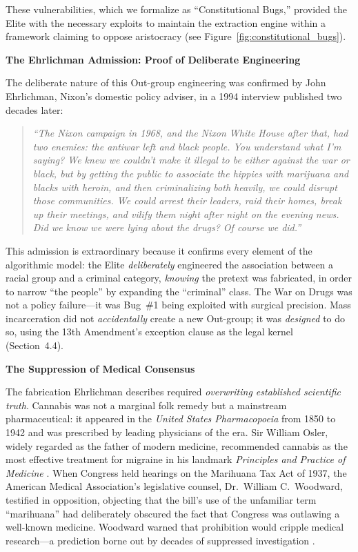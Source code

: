 \documentclass[12pt,openany]{book}
\begin{document}
These vulnerabilities, which we formalize as ``Constitutional Bugs,'' provided the Elite with the necessary exploits to maintain the extraction engine within a framework claiming to oppose aristocracy (see Figure~\ref{fig:constitutional_bugs}).

\textbf{The Ehrlichman Admission: Proof of Deliberate Engineering}

The deliberate nature of this Out-group engineering was confirmed by John Ehrlichman, Nixon's domestic policy adviser, in a 1994 interview published two decades later:

\begin{quote}
\textit{``The Nixon campaign in 1968, and the Nixon White House after that, had two enemies: the antiwar left and black people. You understand what I'm saying? We knew we couldn't make it illegal to be either against the war or black, but by getting the public to associate the hippies with marijuana and blacks with heroin, and then criminalizing both heavily, we could disrupt those communities. We could arrest their leaders, raid their homes, break up their meetings, and vilify them night after night on the evening news. Did we know we were lying about the drugs? Of course we did.''} \cite{baum}
\end{quote}

This admission is extraordinary because it confirms every element of the algorithmic model: the Elite \textit{deliberately} engineered the association between a racial group and a criminal category, \textit{knowing} the pretext was fabricated, in order to narrow ``the people'' by expanding the ``criminal'' class. The War on Drugs was not a policy failure---it was Bug~\#1 being exploited with surgical precision. Mass incarceration did not \textit{accidentally} create a new Out-group; it was \textit{designed} to do so, using the 13th Amendment's exception clause as the legal kernel (Section~4.4).

\textbf{The Suppression of Medical Consensus}

The fabrication Ehrlichman describes required \textit{overwriting established scientific truth}. Cannabis was not a marginal folk remedy but a mainstream pharmaceutical: it appeared in the \textit{United States Pharmacopoeia} from 1850 to 1942 and was prescribed by leading physicians of the era. Sir William Osler, widely regarded as the father of modern medicine, recommended cannabis as the most effective treatment for migraine in his landmark \textit{Principles and Practice of Medicine} \cite{osler}. When Congress held hearings on the Marihuana Tax Act of 1937, the American Medical Association's legislative counsel, Dr.\ William C.\ Woodward, testified in opposition, objecting that the bill's use of the unfamiliar term ``marihuana'' had deliberately obscured the fact that Congress was outlawing a well-known medicine. Woodward warned that prohibition would cripple medical research---a prediction borne out by decades of suppressed investigation \cite{musto, bonnie}.
\end{document}
